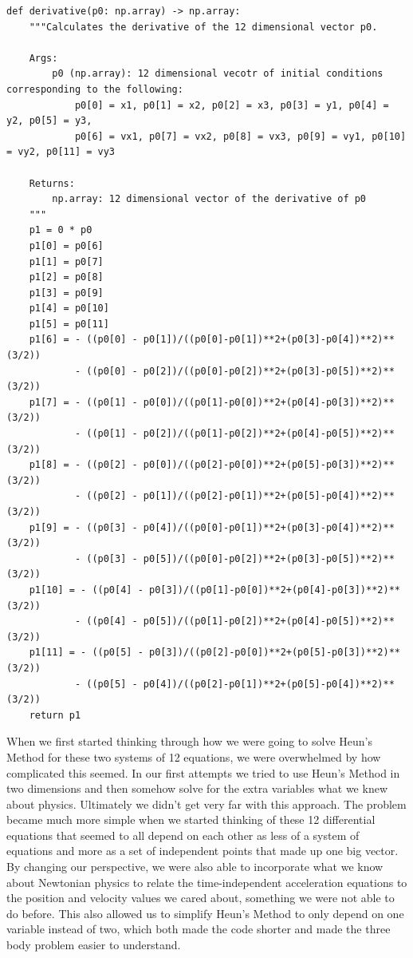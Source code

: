 \documentclass{article}
\begin{document}
\begin{verbatim}
def derivative(p0: np.array) -> np.array:
    """Calculates the derivative of the 12 dimensional vector p0.

    Args:
        p0 (np.array): 12 dimensional vecotr of initial conditions corresponding to the following:
            p0[0] = x1, p0[1] = x2, p0[2] = x3, p0[3] = y1, p0[4] = y2, p0[5] = y3, 
            p0[6] = vx1, p0[7] = vx2, p0[8] = vx3, p0[9] = vy1, p0[10] = vy2, p0[11] = vy3 

    Returns:
        np.array: 12 dimensional vector of the derivative of p0
    """
    p1 = 0 * p0
    p1[0] = p0[6]
    p1[1] = p0[7]
    p1[2] = p0[8]
    p1[3] = p0[9]
    p1[4] = p0[10]
    p1[5] = p0[11]
    p1[6] = - ((p0[0] - p0[1])/((p0[0]-p0[1])**2+(p0[3]-p0[4])**2)**(3/2)) 
            - ((p0[0] - p0[2])/((p0[0]-p0[2])**2+(p0[3]-p0[5])**2)**(3/2))
    p1[7] = - ((p0[1] - p0[0])/((p0[1]-p0[0])**2+(p0[4]-p0[3])**2)**(3/2)) 
            - ((p0[1] - p0[2])/((p0[1]-p0[2])**2+(p0[4]-p0[5])**2)**(3/2))
    p1[8] = - ((p0[2] - p0[0])/((p0[2]-p0[0])**2+(p0[5]-p0[3])**2)**(3/2)) 
            - ((p0[2] - p0[1])/((p0[2]-p0[1])**2+(p0[5]-p0[4])**2)**(3/2))
    p1[9] = - ((p0[3] - p0[4])/((p0[0]-p0[1])**2+(p0[3]-p0[4])**2)**(3/2)) 
            - ((p0[3] - p0[5])/((p0[0]-p0[2])**2+(p0[3]-p0[5])**2)**(3/2))
    p1[10] = - ((p0[4] - p0[3])/((p0[1]-p0[0])**2+(p0[4]-p0[3])**2)**(3/2)) 
            - ((p0[4] - p0[5])/((p0[1]-p0[2])**2+(p0[4]-p0[5])**2)**(3/2))
    p1[11] = - ((p0[5] - p0[3])/((p0[2]-p0[0])**2+(p0[5]-p0[3])**2)**(3/2)) 
            - ((p0[5] - p0[4])/((p0[2]-p0[1])**2+(p0[5]-p0[4])**2)**(3/2))
    return p1
\end{verbatim}
When we first started thinking through how we were going to solve Heun’s Method for these two systems of 12 equations, we were overwhelmed by how complicated this seemed. In our first attempts we tried to use Heun’s Method in two dimensions and then somehow solve for the extra variables what we knew about physics. Ultimately we didn’t get very far with this approach. The problem became much more simple when we started thinking of these 12 differential equations that seemed to all depend on each other as less of a system of equations and more as a set of independent points that made up one big vector. By changing our perspective, we were also able to incorporate what we know about Newtonian physics to relate the time-independent acceleration equations to the position and velocity values we cared about, something we were not able to do before. This also allowed us to simplify Heun’s Method to only depend on one variable instead of two, which both made the code shorter and made the three body problem easier to understand. 
\end{document}
